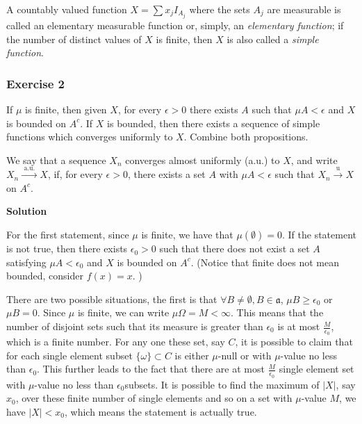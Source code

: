 \documentclass[
]{article}
\begin{document}
A countably valued function \(X=\sum x_j I_{A_j}\) where the sets
\(A_j\) are measurable is called an elementary measurable function or,
simply, an \emph{elementary function}; if the number of distinct values
of \(X\) is finite, then \(X\) is also called a \emph{simple function}.

\hypertarget{exercise-2-2}{%
  \subsubsection{\texorpdfstring{Exercise 2
    }{Exercise 2 }}\label{exercise-2-2}}

If \(\mu\) is finite, then given \(X\), for every \(\epsilon > 0\) there
exists \(A\) such that \(\mu A<\epsilon\) and \(X\) is bounded on
\(A^{c}.\) If \(X\) is bounded, then there exists a sequence of simple
functions which converges uniformly to \(X.\) Combine both propositions.

We say that a sequence \(X_n\) converges almost uniformly (a.u.) to
\(X\), and write \(X_n \stackrel{\text { a.u. }}{\longrightarrow} X\),
if, for every \(\epsilon>0\), there exists a set \(A\) with
\(\mu A<\epsilon\) such that
\(X_n \stackrel{\mathrm{u}}{\longrightarrow} X\) on \(A^c\).

\textbf{Solution}

For the first statement, since \(\mu\) is finite, we have that
\(\mu(\emptyset) = 0\). If the statement is not true, then there exists
\(\epsilon_0 > 0\) such that there does not exist a set \(A\) satisfying
\(\mu A < \epsilon_0\) and \(X\) is bounded on \(A^c\). (Notice that
finite does not mean bounded, consider \(f(x) = x\). )

There are two possible situations, the first is that
\(\forall B \ne \emptyset, B \in \mathfrak a\), \(\mu B \ge \epsilon_0\)
or \(\mu B = 0\). Since \(\mu\) is finite, we can write
\(\mu \Omega = M < \infty\). This means that the number of disjoint sets
such that its measure is greater than \(\epsilon_0\) is at most
\(\frac{M}{\epsilon_0}\), which is a finite number. For any one these
set, say \(C\), it is possible to claim that for each single element
subset \(\{\omega\} \subset C\) is either \(\mu\)-null or with
\(\mu\)-value no less than \(\epsilon_0\). This further leads to the
fact that there are at most \(\frac{M}{\epsilon_0}\) single element set
with \(\mu\)-value no less than \(\epsilon_0\)subsets. It is possible to
find the maximum of \(|X|\), say \(x_0\), over these finite number of
single elements and so on a set with \(\mu\)-value \(M\), we have
\(|X| < x_0\), which means the statement is actually true.
\end{document}
